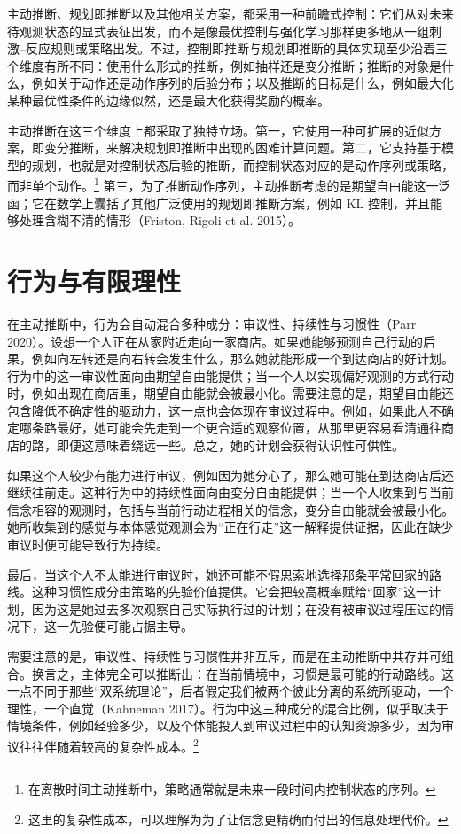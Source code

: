 主动推断、规划即推断以及其他相关方案，都采用一种前瞻式控制：它们从对未来待观测状态的显式表征出发，而不是像最优控制与强化学习那样更多地从一组刺激--反应规则或策略出发。不过，控制即推断与规划即推断的具体实现至少沿着三个维度有所不同：使用什么形式的推断，例如抽样还是变分推断；推断的对象是什么，例如关于动作还是动作序列的后验分布；以及推断的目标是什么，例如最大化某种最优性条件的边缘似然，还是最大化获得奖励的概率。

主动推断在这三个维度上都采取了独特立场。第一，它使用一种可扩展的近似方案，即变分推断，来解决规划即推断中出现的困难计算问题。第二，它支持基于模型的规划，也就是对控制状态后验的推断，而控制状态对应的是动作序列或策略，而非单个动作。\footnote{在离散时间主动推断中，策略通常就是未来一段时间内控制状态的序列。} 第三，为了推断动作序列，主动推断考虑的是期望自由能这一泛函；它在数学上囊括了其他广泛使用的规划即推断方案，例如 KL 控制，并且能够处理含糊不清的情形（Friston, Rigoli et al. 2015）。

\section{行为与有限理性}

在主动推断中，行为会自动混合多种成分：审议性、持续性与习惯性（Parr 2020）。设想一个人正在从家附近走向一家商店。如果她能够预测自己行动的后果，例如向左转还是向右转会发生什么，那么她就能形成一个到达商店的好计划。行为中的这一审议性面向由期望自由能提供；当一个人以实现偏好观测的方式行动时，例如出现在商店里，期望自由能就会被最小化。需要注意的是，期望自由能还包含降低不确定性的驱动力，这一点也会体现在审议过程中。例如，如果此人不确定哪条路最好，她可能会先走到一个更合适的观察位置，从那里更容易看清通往商店的路，即便这意味着绕远一些。总之，她的计划会获得认识性可供性。

如果这个人较少有能力进行审议，例如因为她分心了，那么她可能在到达商店后还继续往前走。这种行为中的持续性面向由变分自由能提供；当一个人收集到与当前信念相容的观测时，包括与当前行动进程相关的信念，变分自由能就会被最小化。她所收集到的感觉与本体感觉观测会为“正在行走”这一解释提供证据，因此在缺少审议时便可能导致行为持续。

最后，当这个人不太能进行审议时，她还可能不假思索地选择那条平常回家的路线。这种习惯性成分由策略的先验价值提供。它会把较高概率赋给“回家”这一计划，因为这是她过去多次观察自己实际执行过的计划；在没有被审议过程压过的情况下，这一先验便可能占据主导。

需要注意的是，审议性、持续性与习惯性并非互斥，而是在主动推断中共存并可组合。换言之，主体完全可以推断出：在当前情境中，习惯是最可能的行动路线。这一点不同于那些“双系统理论”，后者假定我们被两个彼此分离的系统所驱动，一个理性，一个直觉（Kahneman 2017）。行为中这三种成分的混合比例，似乎取决于情境条件，例如经验多少，以及个体能投入到审议过程中的认知资源多少，因为审议往往伴随着较高的复杂性成本。\footnote{这里的复杂性成本，可以理解为为了让信念更精确而付出的信息处理代价。}

